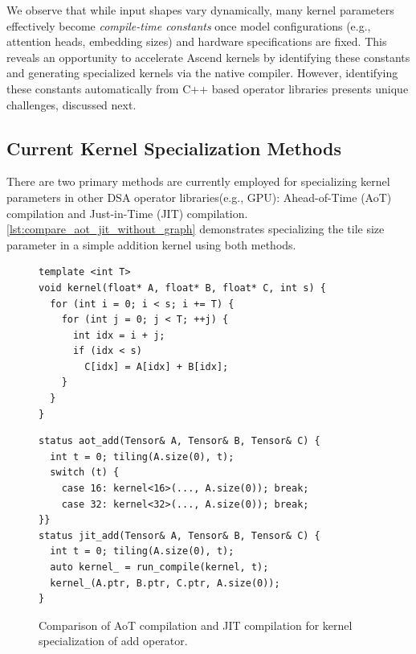 We observe that while input shapes vary dynamically, many kernel parameters effectively become \textit{compile-time constants} once model configurations (e.g., attention heads, embedding sizes) and hardware specifications are fixed. 
This reveals an opportunity to accelerate Ascend kernels by identifying these constants and generating specialized kernels via the native compiler. 
However, identifying these constants automatically from C++ based operator libraries presents unique challenges, discussed next.

\subsection{Current Kernel Specialization Methods}

There are two primary methods are currently employed for specializing kernel parameters in other DSA operator libraries(e.g., GPU): Ahead-of-Time (AoT) compilation and Just-in-Time (JIT) compilation.
\autoref{lst:compare_aot_jit_without_graph} demonstrates specializing the tile size parameter  in a simple addition kernel using both methods.

\begin{figure}[htbp]
\begin{minipage}{0.39\textwidth}
\begin{lstlisting}[basicstyle=\ttfamily\footnotesize, captionpos=b, frame=single]
template <int T>
void kernel(float* A, float* B, float* C, int s) {
  for (int i = 0; i < s; i += T) {
    for (int j = 0; j < T; ++j) {
      int idx = i + j;
      if (idx < s)
        C[idx] = A[idx] + B[idx];
    }
  }
}
\end{lstlisting}
\end{minipage}
\hfill
\begin{minipage}{0.56\textwidth}
\begin{lstlisting}[firstnumber=11, basicstyle=\ttfamily\footnotesize, captionpos=b, frame=single]
status aot_add(Tensor& A, Tensor& B, Tensor& C) {
  int t = 0; tiling(A.size(0), t);
  switch (t) {
    case 16: kernel<16>(..., A.size(0)); break;
    case 32: kernel<32>(..., A.size(0)); break;
}}
status jit_add(Tensor& A, Tensor& B, Tensor& C) {
  int t = 0; tiling(A.size(0), t);
  auto kernel_ = run_compile(kernel, t);
  kernel_(A.ptr, B.ptr, C.ptr, A.size(0));
}
\end{lstlisting}
\end{minipage}
\caption{Comparison of AoT compilation and JIT compilation for kernel specialization of add operator.}
\label{lst:compare_aot_jit_without_graph}
\end{figure}

